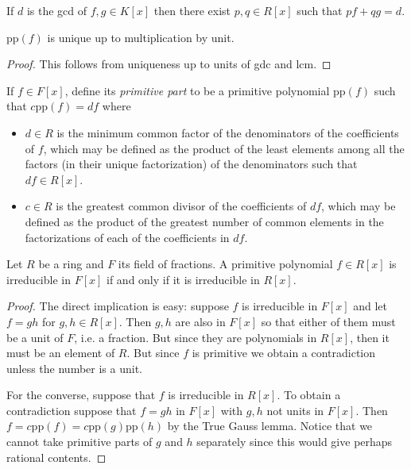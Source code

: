 \begin{lemma}
\label{lemma-gcd-for-polynomials}
If $d$ is the gcd of $f,g \in K[x]$ then there exist $p,q \in R[x]$ such that
$pf+qg=d$.
\end{lemma}



\begin{lemma}
\label{lemma-primitive-part-unique-up-to-unit}
$\text{pp}(f)$ is unique up to multiplication by unit.
\end{lemma}

\begin{proof}
This follows from uniqueness up to units of gdc and lcm.
\end{proof}

\begin{definition}
\label{definition-primitive-part}
If $f\in F[x]$, define its {\it primitive part} to be a primitive polynomial
$\text{pp}(f)$ such that $c\text{pp}(f)=df$ where
\begin{itemize}
\item $d\in R$ is the minimum common
factor of the denominators of the coefficients of $f$, which may be defined as
the product of the least elements among all the factors (in their unique
factorization) of the denominators such that $df \in R[x]$.
\item $c\in R$ is the greatest common divisor of the coefficients of $df$, which
may be defined as the product of the greatest number of common elements in the
factorizations of each of the coefficients in $df$.
\end{itemize}
\end{definition}

\begin{lemma}[Gauss]
\label{lemma-Gauss}
Let $R$ be a ring and $F$ its field of fractions. A primitive polynomial $f\in
R[x]$ is irreducible in $F[x]$ if and only if it is irreducible in $R[x]$.
\end{lemma}

\begin{proof}
The direct implication is easy: suppose $f$ is irreducible in $F[x]$ and let
$f=gh$ for $g,h\in R[x]$. Then $g,h$ are also in $F[x]$ so that either of them
must be a unit of $F$, i.e. a fraction. But since they are polynomials in
$R[x]$, then it must be an element of $R$. But since $f$ is primitive we obtain
a contradiction unless the number is a unit.

For the converse, suppose that $f$ is irreducible in $R[x]$. To obtain a 
contradiction suppose that $f=gh$ in $F[x]$ with $g,h$ not units in $F[x]$.
Then $f=c\text{pp}(f)=c\text{pp}(g)\text{pp}(h)$ by the True Gauss lemma. 
Notice that we cannot take primitive parts of $g$ and $h$ separately since this
would give perhaps rational contents.
\end{proof}


